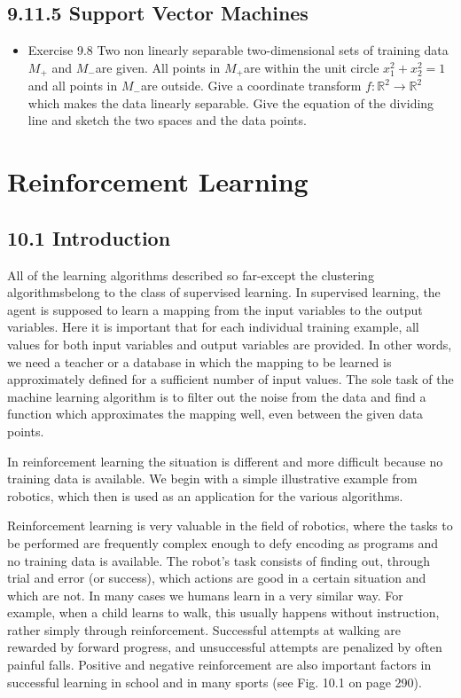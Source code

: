 \documentclass[10pt]{article}
\begin{document}
\subsection*{9.11.5 Support Vector Machines}
\begin{itemize}
  \item Exercise 9.8 Two non linearly separable two-dimensional sets of training data $M_{+}$ and $M_{-}$are given. All points in $M_{+}$are within the unit circle $x_{1}^{2}+x_{2}^{2}=1$ and all points in $M_{-}$are outside. Give a coordinate transform $f: \mathbb{R}^{2} \rightarrow \mathbb{R}^{2}$ which makes the data linearly separable. Give the equation of the dividing line and sketch the two spaces and the data points.
\end{itemize}

\section*{Reinforcement Learning}
\subsection*{10.1 Introduction}
All of the learning algorithms described so far-except the clustering algorithmsbelong to the class of supervised learning. In supervised learning, the agent is supposed to learn a mapping from the input variables to the output variables. Here it is important that for each individual training example, all values for both input variables and output variables are provided. In other words, we need a teacher or a database in which the mapping to be learned is approximately defined for a sufficient number of input values. The sole task of the machine learning algorithm is to filter out the noise from the data and find a function which approximates the mapping well, even between the given data points.


In reinforcement learning the situation is different and more difficult because no training data is available. We begin with a simple illustrative example from robotics, which then is used as an application for the various algorithms.

Reinforcement learning is very valuable in the field of robotics, where the tasks to be performed are frequently complex enough to defy encoding as programs and no training data is available. The robot's task consists of finding out, through trial and error (or success), which actions are good in a certain situation and which are not. In many cases we humans learn in a very similar way. For example, when a child learns to walk, this usually happens without instruction, rather simply through reinforcement. Successful attempts at walking are rewarded by forward progress, and unsuccessful attempts are penalized by often painful falls. Positive and negative reinforcement are also important factors in successful learning in school and in many sports (see Fig. 10.1 on page 290).
\end{document}
